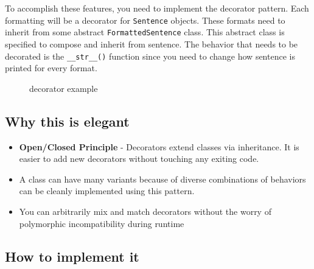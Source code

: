 To accomplish these features, you need to implement the decorator
pattern. Each formatting will be a decorator for \texttt{Sentence}
objects. These formats need to inherit from some abstract
\texttt{FormattedSentence} class. This abstract class is specified to
compose and inherit from sentence. The behavior that needs to be
decorated is the \texttt{\_\_str\_\_()} function since you need to
change how sentence is printed for every format.

\begin{figure}
\centering
{}
\caption{decorator example}
\end{figure}

\subsection{Why this is
elegant}\label{structural-patterns.md__why-this-is-elegant}

\begin{itemize}
\tightlist
\item
  \textbf{Open/Closed Principle} - Decorators extend classes via
  inheritance. It is easier to add new decorators without touching any
  exiting code.
\item
  A class can have many variants because of diverse combinations of
  behaviors can be cleanly implemented using this pattern.
\item
  You can arbitrarily mix and match decorators without the worry of
  polymorphic incompatibility during runtime
\end{itemize}

\subsection{How to implement
it}\label{structural-patterns.md__how-to-implement-it}


